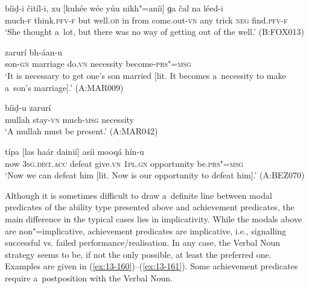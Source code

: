 \begin{exe}
\ex
\label{ex:13-156}
\gll bíiḍ-i čitíl-i, xu [kuhée wée yúu   nikh"=aníi] ɡa čal na léed-i  \\
much-\textsc{f} think.\textsc{pfv-f} but well.\textsc{ob} in from  come.out-\textsc{vn} any trick \textsc{neg} find.\textsc{pfv-f}  \\
\glt `She thought a~lot, but there was no way of getting out of the well.' (B:FOX013)

\ex
\label{ex:13-157}
 zarurí bh-áan-u \\
son-\textsc{gn} marriage do.\textsc{vn} necessity become-\textsc{prs"=msg}  \\
\glt `It is necessary to get one's son married [lit. It becomes a~necessity to make a~son's marriage].' (A:MAR009)

\ex
\label{ex:13-158}
\gll [muloó haans"=ainií] bíiḍ-u zarurí \\
mullah stay-\textsc{vn}  much-\textsc{msg} necessity  \\
\glt `A mullah must be present.' (A:MAR042)

\ex
\label{ex:13-159}
\gll típa [las haár dainií] asíi mooqá  hín-u \\
now \textsc{3sg.dist.acc} defeat give.\textsc{vn} \textsc{1pl.gn} opportunity be.\textsc{prs"=msg}  \\
\glt `Now we can defeat him [lit. Now is our opportunity to defeat him].' (A:BEZ070) 
\end{exe}

 Although it is sometimes difficult to draw a~definite line between modal predicates of the ability type presented above and achievement predicates, the main difference in the typical cases lies in implicativity. While the modals above are non"=implicative, achievement predicates are implicative, i.e., signalling successful vs. failed performance/realisation. In any case, the Verbal Noun strategy seems to be, if not the only possible, at least the preferred one. Examples are given in (\ref{ex:13-160})--(\ref{ex:13-161}). Some achievement predicates require a~postposition with the Verbal Noun.

